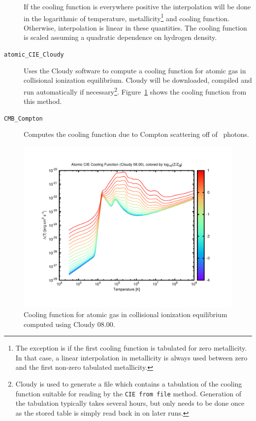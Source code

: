 \begin{description}
\begin{description}
 \end{description}
 If the cooling function is everywhere positive the interpolation will be done in the logarithmic of temperature, metallicity\footnote{The exception is if the first cooling function is tabulated for zero metallicity. In that case, a linear interpolation in metallicity is always used between zero and the first non-zero tabulated metallicity.} and cooling function. Otherwise, interpolation is linear in these quantities. The cooling function is scaled assuming a quadratic dependence on hydrogen density.
 \item [{\tt atomic\_CIE\_Cloudy}] Uses the {\sc Cloudy} software to compute a cooling function for atomic gas in collisional ionization equilibrium. {\sc Cloudy} will be downloaded, compiled and run automatically if necessary\footnote{{\sc Cloudy} is used to generate a file which contains a tabulation of the cooling function suitable for reading by the {\tt CIE from file} method. Generation of the tabulation typically takes several hours, but only needs to be done once as the stored table is simply read back in on later runs.}. Figure~\ref{fig:atomicCIECloudyCoolingFunction} shows the cooling function from this method.
 \item [{\tt CMB\_Compton}] Computes the cooling function due to Compton scattering off of \CMB\ photons.
\end{description}

\begin{figure}
 \begin{center}
 \includegraphics[width=160mm]{../plots/cooling_function_Atomic_CIE_Cloudy.pdf}
 \end{center}
 \caption{Cooling function for atomic gas in collisional ionization equilibrium computed using Cloudy 08.00.}
 \label{fig:atomicCIECloudyCoolingFunction}
\end{figure}

